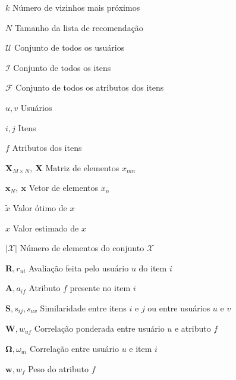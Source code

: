 \begin{simbolos}\label{simbolos}
    \item[$k$]  Número de vizinhos mais próximos 
    \item[$N$] Tamanho da lista de recomendação  
    \item[$\mathcal{U}$] Conjunto de todos os usuários 
    \item[$\mathcal{I}$] Conjunto de todos os itens  
    \item[$\mathcal{F}$] Conjunto  de todos os atributos dos itens
    \item[$u, v$] Usuários 
    \item[$i, j$] Itens 
    \item[$f$] Atributos dos itens 
    \item[$\mathbf{X}_{M \times N},~\mathbf{X}$] Matriz de elementos $x_{mn}$ 
    \item[$\mathbf{x}_{N},~\mathbf{x}$] Vetor de elementos $x_{n}$
    \item[$\tilde{x}$] Valor ótimo de $x$
    \item[$\hat{x}$] Valor estimado de $x$
    \item[$|\mathcal{X}|$] Número de elementos do conjunto $\mathcal{X}$
    \item[$\mathbf{R}, r_{ui}$] Avaliação feita pelo usuário $u$ do item $i$
    \item[$\mathbf{A}, a_{if}$] Atributo $f$ presente no item $i$
    \item[$\mathbf{S}, s_{ij}, s_{uv}$] Similaridade entre itens $i$ e $j$ ou entre usuários $u$ e $v$
    \item[$\mathbf{W}, w_{uf}$] Correlação ponderada entre usuário $u$ e atributo $f$ 
    \item[$\mathbf{\Omega}, \omega_{ui}$] Correlação entre usuário $u$ e item $i$ 
    \item[$\mathbf{w}, w_{f}$] Peso do atributo $f$
\end{simbolos}
